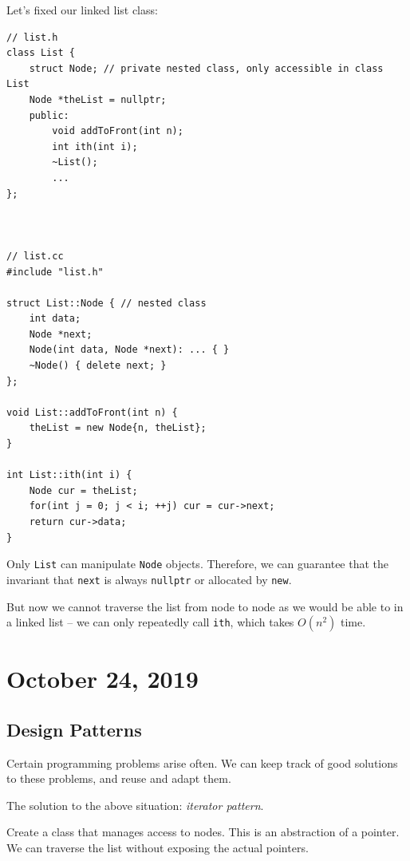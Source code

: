 \documentclass[11pt]{article}
\theoremstyle{definition}
\begin{document}
Let's fixed our linked list class:
\begin{lstlisting}
// list.h
class List {
    struct Node; // private nested class, only accessible in class List
    Node *theList = nullptr;
    public:
        void addToFront(int n);
        int ith(int i);
        ~List();
        ...
};



// list.cc
#include "list.h"

struct List::Node { // nested class
    int data;
    Node *next;
    Node(int data, Node *next): ... { }
    ~Node() { delete next; }
};

void List::addToFront(int n) {
    theList = new Node{n, theList};
}

int List::ith(int i) {
    Node cur = theList;
    for(int j = 0; j < i; ++j) cur = cur->next;
    return cur->data;
}
\end{lstlisting}
Only {\tt List} can manipulate {\tt Node} objects. Therefore, we can guarantee that the invariant that {\tt next} is always {\tt nullptr} or allocated by {\tt new}.

But now we cannot traverse the list from node to node as we would be able to in a linked list -- we can only repeatedly call {\tt ith}, which takes $O(n^2)$ time.

\newpage

\section{October 24, 2019}

\subsection{Design Patterns}
Certain programming problems arise often. We can keep track of good solutions to these problems, and reuse and adapt them.

The solution to the above situation: {\it iterator pattern}.

Create a class that manages access to nodes. This is an abstraction of a pointer. We can traverse the list without exposing the actual pointers.
\end{document}
